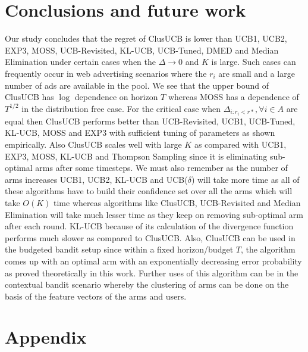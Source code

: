 \documentclass[11pt,letterpaper,english]{article}
\begin{document}
\section{Conclusions and future work}
Our study concludes that the regret of ClusUCB is lower than UCB1, UCB2, EXP3, MOSS, UCB-Revisited, KL-UCB, UCB-Tuned, DMED and Median Elimination under certain cases when the $\Delta \rightarrow 0$ and $K$ is large. Such cases can frequently occur in web advertising scenarios where the $r_{i}$ are small and a large number of ads are available in the pool. We see that the upper bound of ClusUCB has $\log$ dependence on horizon $T$ whereas MOSS has a dependence of $T^{1/2}$ in the distribution free case. For the critical case when $\Delta_{i:r_{i}<r*}, \forall i\in A$ are equal then ClusUCB performs better than UCB-Revisited, UCB1, UCB-Tuned, KL-UCB, MOSS and EXP3 with sufficient tuning of parameters as shown empirically. Also ClusUCB scales well with large $K$ as compared with UCB1, EXP3, MOSS, KL-UCB and Thompson Sampling since it is eliminating sub-optimal arms after some timesteps. 
We must also remember as the number of arms increases UCB1, UCB2, KL-UCB and UCB($\delta$) will take more time as all of these algorithms have to build their confidence set over all the arms which will take $O(K)$ time whereas algorithms like ClusUCB, UCB-Revisited and Median Elimination will take much lesser time as they keep on removing sub-optimal arm after each round. KL-UCB because of its calculation of the divergence function performs much slower as compared to ClusUCB. Also, ClusUCB can be used in the budgeted bandit setup since within a fixed horizon/budget $T$, the algorithm comes up with an optimal arm with an exponentially decreasing error probability as proved theoretically in this work. Further uses of this algorithm can be in the contextual bandit scenario whereby the clustering of arms can be done on the basis of the feature vectors of the arms and users.










\clearpage
\newpage
\onecolumn
 \section*{Appendix}


\end{document}
